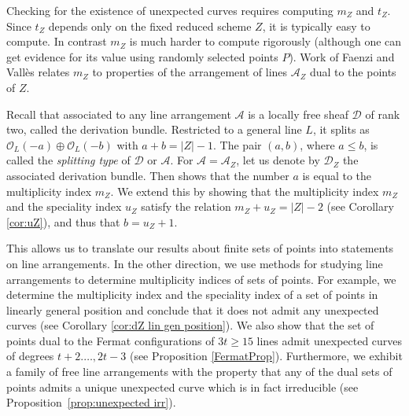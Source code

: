 \documentclass[12pt]{amsart}
\numberwithin{equation}{section}
\theoremstyle{definition}
\begin{document}
Checking for the existence of unexpected curves  requires computing $m_Z$ and $t_Z$.
Since $t_Z$ depends only on the fixed reduced scheme $Z$, it is typically easy to compute. 
In contrast $m_Z$ is much harder to compute rigorously (although one can get evidence for its value
using randomly selected points $P$). Work of Faenzi and Vall\`es \cite{FV2} relates $m_Z$ to properties of
the arrangement of lines ${\mathcal{A}}_Z$ dual to the points of $Z$.

Recall that associated to any line arrangement ${\mathcal{A}}$ is a locally free sheaf ${\mathcal{D}}$ of rank two, called the derivation bundle. Restricted to a general line $L$, it splits as ${\mathcal{O}}_L (-a) \oplus {\mathcal{O}}_L (-b)$ with $a + b = |Z| -1$. The pair $(a, b)$, where $a \le b$, is called the \emph{splitting type} of ${\mathcal{D}}$ or ${\mathcal{A}}$. 
For ${\mathcal{A}}= {\mathcal{A}}_Z$,  let us denote by ${\mathcal{D}}_Z$ the associated derivation bundle. Then \cite[Theorem 4.3]{FV2}
shows that the number $a$ is equal to the multiplicity index $m_Z$. 
We extend this by showing that the multiplicity index $m_Z$ and the speciality index $u_Z$ satisfy the relation $m_Z + u_Z = |Z| - 2$ (see Corollary \ref{cor:uZ}), and thus
that $b=u_Z+1$. 

This allows us to translate our results about finite sets of points into statements on line arrangements. In the other direction, we use methods for studying line arrangements to determine multiplicity indices of sets of points. For example, we determine the multiplicity index and the speciality index of a set of points in linearly general position and conclude that it does not admit any unexpected curves (see Corollary \ref{cor:dZ lin gen position}).  
We also show that the set of points dual to the Fermat configurations of $3 t \ge 15$ lines admit unexpected curves of degrees $t+2.\ldots,2t-3$ (see Proposition \ref{FermatProp}). 
Furthermore, we exhibit a family of free line arrangements with the property that any of the dual sets of points admits a unique unexpected curve which is in fact  irreducible (see Proposition~\ref{prop:unexpected irr}).
\smallskip 
\end{document}
